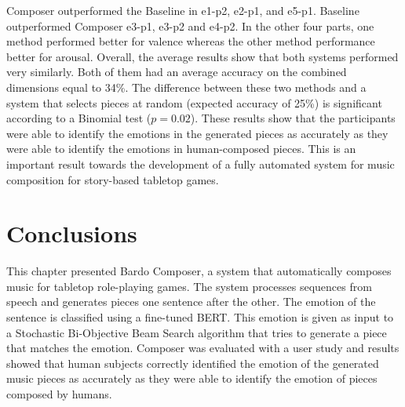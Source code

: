 Composer outperformed the Baseline in e1-p2, e2-p1, and e5-p1. Baseline outperformed Composer e3-p1, e3-p2 and e4-p2. In the other four parts, one method performed better for valence whereas the other method performance better for arousal. Overall, the average results show that both systems performed very similarly. Both of them had an average accuracy on the combined dimensions equal to 34\%. The difference between these two methods and a system that selects pieces at random (expected accuracy of 25\%) is significant according to a Binomial test ($p = 0.02$).
These results show that the  participants  were  able  to  identify  the  emotions  in  the generated pieces as accurately as they were able to identify the emotions in human-composed pieces. This is an important result towards the development of a fully automated system for music composition for story-based tabletop games.

\section{Conclusions}

This chapter presented Bardo Composer, a system that automatically composes music for tabletop role-playing games. The system processes sequences from speech and generates pieces one sentence after the other. The emotion of the sentence is classified using a fine-tuned BERT. This emotion is given as input to a Stochastic Bi-Objective Beam Search algorithm that tries to generate a piece that matches the emotion. Composer was evaluated with a user study and results showed that human subjects correctly identified the emotion of the generated music pieces as accurately as they were able to identify the emotion of pieces composed by humans.
